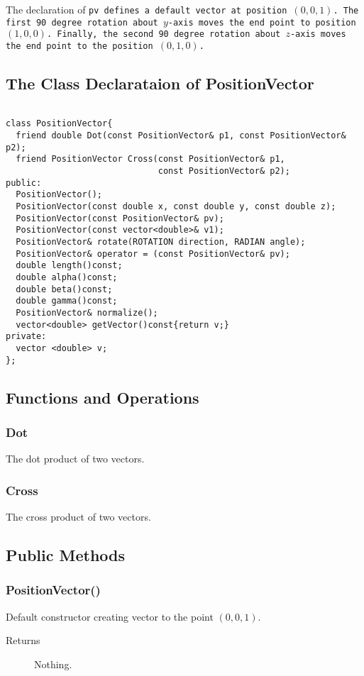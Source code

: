 The declaration of \tt pv \rm defines a default vector at position $(0,0,1)$.
The first 90 degree rotation about $y$-axis moves the end point to position 
$(1,0,0)$. Finally, the second 90 degree rotation about $z$-axis 
moves the end point to the position $(0,1,0)$.
 
\subsection{The Class Declarataion of PositionVector}
\begin{verbatim}
 
class PositionVector{
  friend double Dot(const PositionVector& p1, const PositionVector& p2);
  friend PositionVector Cross(const PositionVector& p1, 
                              const PositionVector& p2);  
public:
  PositionVector();
  PositionVector(const double x, const double y, const double z);
  PositionVector(const PositionVector& pv);
  PositionVector(const vector<double>& v1);
  PositionVector& rotate(ROTATION direction, RADIAN angle);
  PositionVector& operator = (const PositionVector& pv);
  double length()const;
  double alpha()const;
  double beta()const;
  double gamma()const;
  PositionVector& normalize(); 
  vector<double> getVector()const{return v;}
private:
  vector <double> v;
};
\end{verbatim}

\subsection{Functions and Operations}
\subsubsection{Dot}
The  dot product of two vectors.

\subsubsection{Cross}
The cross product of two vectors.

\subsection{Public Methods}
\subsubsection{PositionVector()}
Default constructor creating vector to the point $(0,0,1)$. 
    \begin{description}
       \item [Returns] Nothing.
    \end{description} 

